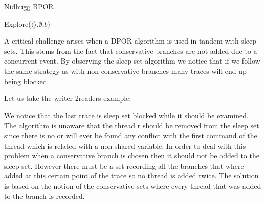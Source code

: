\begin{algorithm}
    \caption{Nidhugg BPOR}
    \label{Nidhugg BPOR}
    Explore($\langle \rangle$,$\emptyset$,$b$)\;
\end{algorithm}

A critical challenge arises when a DPOR algorithm is used in tandem with sleep sets. This stems from the fact that conservative branches are not added due to a
concurrent event. By observing the sleep set algorithm we notice that if we follow the same strategy as with non-conservative branches many traces will end up being blocked.

Let us take the writer-2readers example:


We notice that the last trace is sleep set blocked while it should be examined. The algorithm is unaware that the thread r should be removed from the sleep set since there is no
or will ever be found any conflict with the first command of the thread which is related with a non shared variable. In order to deal with this problem when a conservative
branch is chosen then it should not be added to the sleep set. However there must be a set recording all the branches that where added at this certain point of the trace
so no thread is added twice. The solution is based on the notion of the conservative sets where every thread that was added to the branch is recorded. 

